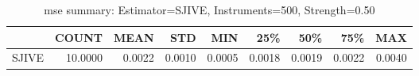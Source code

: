 \begin{table}[ht]
\centering
\caption{mse summary: Estimator=SJIVE, Instruments=500, Strength=0.50}
\begin{tabular}{lrrrrrrrr}
\toprule
 & COUNT & MEAN & STD & MIN & 25\% & 50\% & 75\% & MAX \\
\midrule
SJIVE & 10.0000 & 0.0022 & 0.0010 & 0.0005 & 0.0018 & 0.0019 & 0.0022 & 0.0040 \\
\bottomrule
\end{tabular}
\end{table}
